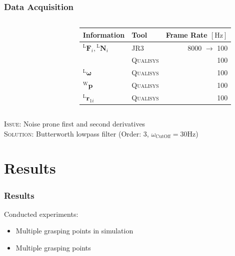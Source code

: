 \documentclass[student,noshadow]{ITRslides}
\renewcommand{\vec}[1]{\boldsymbol{#1}}
\renewcommand{\vec}[1]{\boldsymbol{#1}}
\newcommand{\scr}[1]{\mathrm{#1}}
\begin{document}
\begin{frame}
	\frametitle{Data Acquisition}
	\begin{columns}
		\begin{column}{0.35\textwidth}
			\begin{figure}
				\centering
				
			\end{figure}	
		\end{column}
		\begin{column}{0.65\textwidth}
			\begin{tabular}{llr}
				\toprule
				Information                                   & Tool              & Frame Rate $\left[\mathrm{Hz}\right]$ \\
				\midrule
				${^\scr{L}}\vec{F}_{i},{^\scr{L}}\vec{N}_{i}$ & \textsc{JR3}      & 8000 $\rightarrow$ 100                \\
				                                              & \textsc{Qualisys} & 100                                   \\
				$^\scr{L}\vec{\omega}$                        & \textsc{Qualisys} & 100                                   \\
				$^\scr{W}\vec{p}$                             & \textsc{Qualisys} & 100                                   \\
				$^\scr{L}\vec{r}_{1i}$                        & \textsc{Qualisys} & 100                                   \\
				\bottomrule
			\end{tabular}
		\end{column}
	\end{columns}
	\textsc{Issue}: Noise prone first and second derivatives\\
	\textsc{Solution}: Butterworth lowpass filter (Order: 3, $\omega_\mathrm{CutOff} = 30 \mathrm{Hz}$)
\end{frame}

\section{Results}
\begin{frame}
	\frametitle{Results}
	Conducted experiments:
	\vspace{0.5cm}
	\begin{itemize}
		\item Multiple grasping points in simulation
		\item Multiple grasping points
	\end{itemize}
\end{frame}
\end{document}
